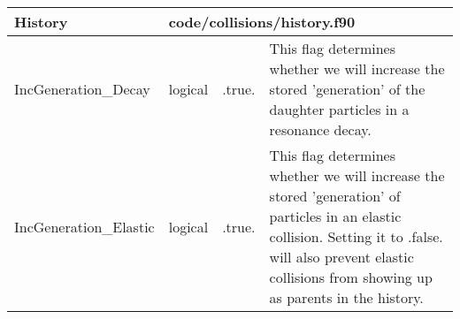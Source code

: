 \documentclass{article}
\begin{document}
{ }




\begin{longtable}{llll}
\toprule
\textbf{\large{History}} & \multicolumn{3}{l}{\footnotesize{code/collisions/history.f90}}\\*
\midrule
\endfirsthead
\midrule
\endhead
IncGeneration\_Decay & \begin{minipage}[t]{2cm}logical\end{minipage} & \begin{minipage}[t]{2cm}.true.\end{minipage} & \begin{minipage}[t]{12cm}This flag determines whether we will increase the stored 'generation' of the daughter particles in a resonance decay.\end{minipage}\\*
\midrule
IncGeneration\_Elastic & \begin{minipage}[t]{2cm}logical\end{minipage} & \begin{minipage}[t]{2cm}.true.\end{minipage} & \begin{minipage}[t]{12cm}This flag determines whether we will increase the stored 'generation' of particles in an elastic collision. Setting it to .false. will also prevent elastic collisions from showing up as parents in the history.\end{minipage}\\*
\bottomrule
\end{longtable}
{ }



\end{document}
